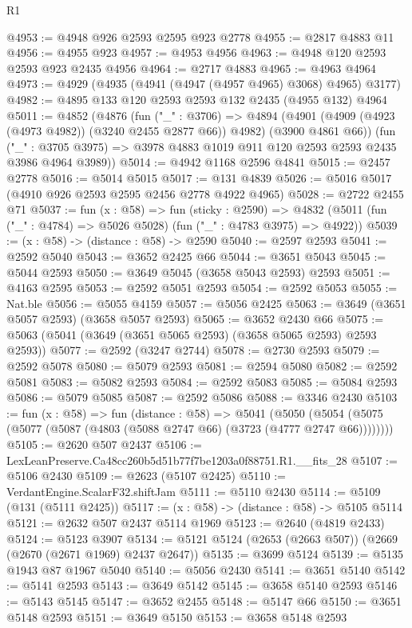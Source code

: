 \begin{lexlean}{R1}
\begin{coremodule}
@4953 := @4948 @926 @2593 @2595 @923 @2778
@4955 := @2817 @4883 @11
@4956 := @4955 @923
@4957 := @4953 @4956
@4963 := @4948 @120 @2593 @2593 @923 @2435 @4956
@4964 := @2717 @4883
@4965 := @4963 @4964
@4973 := @4929 (@4935 (@4941 (@4947 (@4957 @4965) @3068) @4965) @3177)
@4982 := @4895 @133 @120 @2593 @2593 @132 @2435 (@4955 @132) @4964
@5011 := @4852
    (@4876
      (fun ("_" : @3706) =>
      @4894 (@4901 (@4909 (@4923 (@4973 @4982)) (@3240 @2455 @2877 @66)) @4982) (@3900 @4861 @66))
      (fun ("_" : @3705 @3975) => @3978 @4883 @1019 @911 @120 @2593 @2593 @2435 @3986 @4964 @3989))
@5014 := @4942 @1168 @2596 @4841
@5015 := @2457 @2778
@5016 := @5014 @5015
@5017 := @131 @4839
@5026 := @5016 @5017 (@4910 @926 @2593 @2595 @2456 @2778 @4922 @4965)
@5028 := @2722 @2455 @71
@5037 := fun (x : @58) =>
  fun (sticky : @2590) =>
  @4832 (@5011 (fun ("_" : @4784) => @5026 @5028) (fun ("_" : @4783 @3975) => @4922))
@5039 := (x : @58) -> (distance : @58) -> @2590
@5040 := @2597 @2593
@5041 := @2592 @5040
@5043 := @3652 @2425 @66
@5044 := @3651 @5043
@5045 := @5044 @2593
@5050 := @3649 @5045 (@3658 @5043 @2593) @2593
@5051 := @4163 @2595
@5053 := @2592 @5051 @2593
@5054 := @2592 @5053
@5055 := Nat.ble
@5056 := @5055 @4159
@5057 := @5056 @2425
@5063 := @3649 (@3651 @5057 @2593) (@3658 @5057 @2593)
@5065 := @3652 @2430 @66
@5075 := @5063 (@5041 (@3649 (@3651 @5065 @2593) (@3658 @5065 @2593) @2593 @2593))
@5077 := @2592 (@3247 @2744)
@5078 := @2730 @2593
@5079 := @2592 @5078
@5080 := @5079 @2593
@5081 := @2594 @5080
@5082 := @2592 @5081
@5083 := @5082 @2593
@5084 := @2592 @5083
@5085 := @5084 @2593
@5086 := @5079 @5085
@5087 := @2592 @5086
@5088 := @3346 @2430
@5103 := fun (x : @58) =>
  fun (distance : @58) =>
  @5041 (@5050 (@5054 (@5075 (@5077 (@5087 (@4803 (@5088 @2747 @66) (@3723 (@4777 @2747 @66))))))))
@5105 := @2620 @507 @2437
@5106 := LexLeanPreserve.Ca48cc260b5d51b77f7be1203a0f88751.R1.__fits_28
@5107 := @5106 @2430
@5109 := @2623 (@5107 @2425)
@5110 := VerdantEngine.ScalarF32.shiftJam
@5111 := @5110 @2430
@5114 := @5109 (@131 (@5111 @2425))
@5117 := (x : @58) -> (distance : @58) -> @5105 @5114
@5121 := @2632 @507 @2437 @5114 @1969
@5123 := @2640 (@4819 @2433)
@5124 := @5123 @3907
@5134 := @5121 @5124 (@2653 (@2663 @507)) (@2669 (@2670 (@2671 @1969) @2437 @2647))
@5135 := @3699 @5124
@5139 := @5135 @1943 @87 @1967 @5040
@5140 := @5056 @2430
@5141 := @3651 @5140
@5142 := @5141 @2593
@5143 := @3649 @5142
@5145 := @3658 @5140 @2593
@5146 := @5143 @5145
@5147 := @3652 @2455
@5148 := @5147 @66
@5150 := @3651 @5148 @2593
@5151 := @3649 @5150
@5153 := @3658 @5148 @2593

\end{coremodule}
\end{lexlean}
